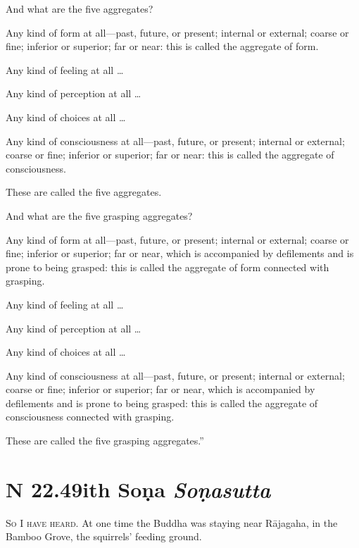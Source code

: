 \documentclass[12pt,openany]{book}%
\newcommand*{\suttatitleacronym}[1]{\smaller[2]{#1}\vspace*{.3em}}
\newcommand*{\suttatitletranslation}[1]{\linebreak{#1}}
\newcommand*{\suttatitleroot}[1]{\linebreak\smaller[2]\itshape{#1}}
\newcommand*{\tocacronym}[1]{\hspace*{-3.3em}{#1}\quad}
\newcommand*{\toctranslation}[1]{#1}
\newcommand*{\tocroot}[1]{(\textit{#1})}
\newcommand*{\scevam}[1]{\textsc{#1}}
\begin{document}
And what are the five aggregates? 

Any kind of form at all—past, future, or present; internal or external; coarse or fine; inferior or superior; far or near: this is called the aggregate of form. 

Any kind of feeling at all … 

Any kind of perception at all … 

Any kind of choices at all … 

Any kind of consciousness at all—past, future, or present; internal or external; coarse or fine; inferior or superior; far or near: this is called the aggregate of consciousness. 

These are called the five aggregates. 

And what are the five grasping aggregates? 

Any kind of form at all—past, future, or present; internal or external; coarse or fine; inferior or superior; far or near, which is accompanied by defilements and is prone to being grasped: this is called the aggregate of form connected with grasping. 

Any kind of feeling at all … 

Any kind of perception at all … 

Any kind of choices at all … 

Any kind of consciousness at all—past, future, or present; internal or external; coarse or fine; inferior or superior; far or near, which is accompanied by defilements and is prone to being grasped: this is called the aggregate of consciousness connected with grasping. 

These are called the five grasping aggregates.” 

%
\section*{{\suttatitleacronym SN 22.49}{\suttatitletranslation With Soṇa }{\suttatitleroot Soṇasutta}}
\addcontentsline{toc}{section}{\tocacronym{SN 22.49} \toctranslation{With Soṇa } \tocroot{Soṇasutta}}

\scevam{So I have heard. }At one time the Buddha was staying near \textsanskrit{Rājagaha}, in the Bamboo Grove, the squirrels’ feeding ground. 
\end{document}
